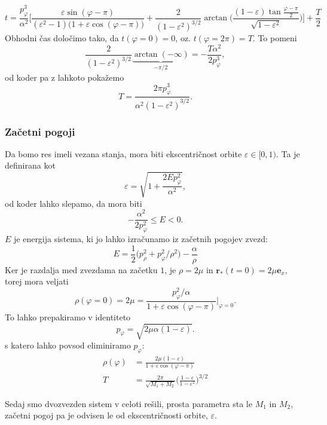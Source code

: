 \documentclass[12pt, a4paper]{article}
\renewcommand{\r}{
    \ensuremath{\mathbf{r}}
}
\newcommand{\ee}{
    \ensuremath{\mathbf{e}}
}
\begin{document}
\begin{equation}
    t = \frac{p_\varphi^3}{\alpha^2}\bigg[\frac{\varepsilon\sin(\varphi-\pi)}{(\varepsilon^2 - 1)\big(1 +
        \varepsilon\cos(\varphi - \pi)\big)} +\frac{2}{(1 - \varepsilon^2)^{3/2}}\arctan\bigg(\frac{(1 - \varepsilon)
    \tan\frac{\varphi-\pi}{2}}{\sqrt{1 - \varepsilon^2}}\bigg)\bigg]+\frac{T}{2}
    \label{casovna}
\end{equation}
Obhodni \v cas dolo\v cimo tako, da $t(\varphi = 0) = 0$, oz. $t(\varphi = 2\pi) = T$. To pomeni
\[
    \frac{2}{(1 - \varepsilon^2)^{3/2}}\underbrace{\arctan(-\infty)}_{-\pi/2} = -\frac{T\alpha^2}{2p^3_\varphi},
\]
od koder pa z lahkoto poka\v zemo
\begin{equation}
    T = \frac{2\pi p^3_\varphi}{\alpha^2(1 - \varepsilon^2)^{3/2}}.
    \label{leto}
\end{equation}
\subsubsection{Za\v cetni pogoji}
Da bomo res imeli vezana stanja, mora biti ekscentri\v cnost orbite $\varepsilon \in [0, 1)$. Ta je definirana kot
\[
    \varepsilon = \sqrt{1 + \frac{2Ep_\varphi^2}{\alpha^2}},
\]
od koder lahko slepamo, da mora biti
\[
    -\frac{\alpha^2}{2p^2_\varphi} \leq E < 0.
\]
$E$ je energija sistema, ki jo lahko izra\v cunamo iz za\v cetnih pogojev zvezd:
\begin{equation}
    E = \frac{1}{2}\big(p_\rho^2 + p_\varphi^2/\rho^2\big) - \frac{\alpha}{\rho}
\end{equation}
Ker je razdalja med zvezdama na za\v cetku $1$, je $\rho = 2\mu$ in $\r_*(t = 0) = 2\mu\ee_x$,
torej mora veljati
\begin{equation}
    \rho(\varphi = 0) = 2\mu = \frac{p_\varphi^2/\alpha}{1 + \varepsilon\cos(\varphi-\pi)}\bigg|_{\varphi = 0}.
\end{equation}
To lahko prepakiramo v identiteto
\begin{equation}
    p_\varphi = \sqrt{2\mu\alpha(1 - \varepsilon)}.
\end{equation}
s katero lahko povsod eliminiramo $p_\varphi$:
\begin{align}
    \rho(\varphi) &= \frac{2\mu(1 - \varepsilon)}{1 + \varepsilon\cos(\varphi - \pi)} \\
    T &= \frac{2\pi}{\sqrt{M_1 + M_2}}\bigg(\frac{1 - \varepsilon}{1 - \varepsilon^2}\bigg)^{3/2}
\end{align}

Sedaj smo dvozvezden sistem v celoti re\v sili, prosta parametra sta le $M_1$ in $M_2$, za\v cetni pogoj pa je odvisen
le od ekscentri\v cnosti orbite, $\varepsilon$.
\end{document}
